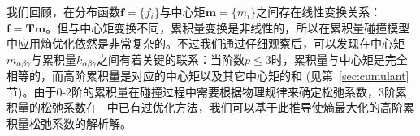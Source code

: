 
我们回顾，在分布函数$\bm{f}\!=\!\{f_i\}$与中心矩$\bm{m}\!=\!\{m_i\}$之间存在线性变换关系：$\bm{f}\!=\!\bm{T}\bm{m}$。但与中心矩变换不同，累积量变换是非线性的，所以在累积量碰撞模型中应用熵优化依然是非常复杂的。不过我们通过仔细观察后，可以发现在中心矩$m_{\alpha\beta\gamma}$与累积量$k_{\alpha\beta\gamma}$之间有着关键的联系：当阶数$p\!\leq\!3$时，累积量与中心矩是完全相等的，而高阶累积量是对应的中心矩以及其它中心矩的和 (见第~\ref{sec:cumulant} 节)。由于0-2阶的累积量在碰撞过程中需要根据物理规律来确定松弛系数，3阶累积量的松弛系数在~\citep{Geier-2017} 中已有过优化方法，我们可以基于此推导使熵最大化的高阶累积量松弛系数的解析解。

